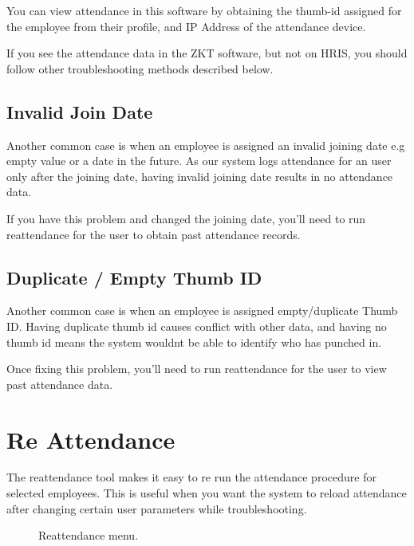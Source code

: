 \documentclass[letterpaper,10pt,english]{sphinxmanual}
\begin{document}
You can view attendance in this software by obtaining the thumb-id assigned for the employee from their profile, and IP Address of the attendance device.

If you see the attendance data in the ZKT software, but not on HRIS, you should follow other troubleshooting methods described  below.


\subsection{Invalid Join Date}
\label{\detokenize{attendance/troubleshooting:invalid-join-date}}
Another common case is when an employee is assigned an invalid joining date e.g empty value or a date in the future. As our system logs attendance for an user only after the joining date, having invalid joining date results in no attendance data.

If you have this problem and changed the joining date, you’ll need to run reattendance for the user to obtain past attendance records.


\subsection{Duplicate / Empty Thumb ID}
\label{\detokenize{attendance/troubleshooting:duplicate-empty-thumb-id}}
Another common case is when an employee is assigned empty/duplicate Thumb ID. Having duplicate thumb id causes conflict with other data, and having no thumb id means the system wouldnt be able to identify who has punched in.

Once fixing this problem, you’ll need to run reattendance for the user to view past attendance data.


\section{Re Attendance}
\label{\detokenize{attendance/troubleshooting:re-attendance}}
The reattendance tool makes it easy to re run the attendance procedure for selected employees. This is useful when you want the system to reload attendance after changing certain user parameters while troubleshooting.

\begin{figure}[htbp]
\centering
\capstart

\noindent{}
\caption{Reattendance menu.}\label{\detokenize{attendance/troubleshooting:id1}}\end{figure}
\end{document}
